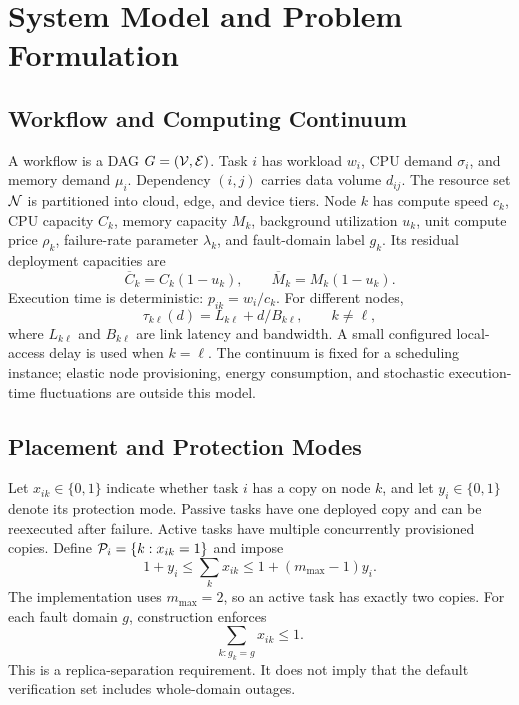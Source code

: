 \section{System Model and Problem Formulation}
\label{sec:model}

\subsection{Workflow and Computing Continuum}
A workflow is a DAG $G=(\mathcal{V},\mathcal{E})$. Task $i$ has workload $w_i$,
CPU demand $\sigma_i$, and memory demand $\mu_i$. Dependency $(i,j)$ carries
data volume $d_{ij}$. The resource set $\mathcal{N}$ is partitioned into cloud,
edge, and device tiers. Node $k$ has compute speed $c_k$, CPU capacity $C_k$,
memory capacity $M_k$, background utilization $u_k$, unit compute price
$\rho_k$, failure-rate parameter $\lambda_k$, and fault-domain label $g_k$.
Its residual deployment capacities are
\begin{equation}
 \overline C_k=C_k(1-u_k),\qquad
 \overline M_k=M_k(1-u_k).
\end{equation}
Execution time is deterministic: $p_{ik}=w_i/c_k$. For different nodes,
\begin{equation}
 \tau_{k\ell}(d)=L_{k\ell}+d/B_{k\ell},\qquad k\ne\ell,
\end{equation}
where $L_{k\ell}$ and $B_{k\ell}$ are link latency and bandwidth. A small
configured local-access delay is used when $k=\ell$. The continuum is fixed
for a scheduling instance; elastic node provisioning, energy consumption,
and stochastic execution-time fluctuations are outside this model.

\subsection{Placement and Protection Modes}
Let $x_{ik}\in\{0,1\}$ indicate whether task $i$ has a copy on node $k$, and
let $y_i\in\{0,1\}$ denote its protection mode. Passive tasks have one
deployed copy and can be reexecuted after failure. Active tasks have multiple
concurrently provisioned copies. Define
$\mathcal{P}_{i}=\{k:x_{ik}=1\}$ and impose
\begin{equation}
 1+y_i\leq \sum_k x_{ik}
 \leq 1+(m_{\max}-1)y_i.
 \label{eq:replicas}
\end{equation}
The implementation uses $m_{\max}=2$, so an active task has exactly two
copies. For each fault domain $g$, construction enforces
\begin{equation}
 \sum_{k:g_k=g}x_{ik}\leq 1.
 \label{eq:domains}
\end{equation}
This is a replica-separation requirement. It does not imply that the default
verification set includes whole-domain outages.

